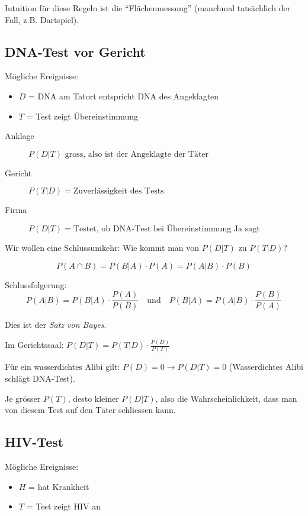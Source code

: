 \documentclass[10pt,a4paper]{scrartcl}
\begin{document}
Intuition für diese Regeln ist die ``Flächenmessung'' (manchmal tatsächlich der Fall, z.B. Dartspiel).

\subsection{DNA-Test vor Gericht}
Mögliche Ereignisse:
\begin{itemize}
\item $D$ = DNA am Tatort entspricht DNA des Angeklagten
\item $T$ = Test zeigt Übereinstimmung
\end{itemize}

\begin{description} %
\item[Anklage] $P(D|T) \mbox{ gross, also ist der Angeklagte der Täter}$
\item[Gericht] $P(T|D) = \mbox{Zuverlässigkeit des Tests}$
\item[Firma] $P(D|T) = \mbox{Testet, ob DNA-Test bei Übereinstimmung Ja sagt}$
\end{description}

Wir wollen eine Schlussumkehr: Wie kommt man von $P(D|T)$ zu $P(T|D)$?

$$P(A \cap B) = P(B|A) \cdot P(A) = P(A|B) \cdot P(B)$$

Schlussfolgerung:
$$P(A|B) = P(B|A) \cdot \frac{P(A)}{P(B)}\quad \mbox{und} \quad P(B|A) = P(A|B) \cdot \frac{P(B)}{P(A)}$$

Dies ist der \emph{Satz von Bayes}.

Im Gerichtssaal: $P(D|T) = P(T|D) \cdot \frac{P(D)}{P(T)}$

Für ein wasserdichtes Alibi gilt: $P(D) = 0 \rightarrow P(D|T) = 0$ (Wasserdichtes Alibi schlägt DNA-Test).

Je grösser $P(T)$, desto kleiner $P(D|T)$, also die Wahrscheinlichkeit, dass man von diesem Test auf den Täter schliessen kann.

\subsection{HIV-Test}
Mögliche Ereignisse:
\begin{itemize}
\item $H$ = hat Krankheit
\item $T$ = Test zeigt HIV an
\end{itemize}
\end{document}
